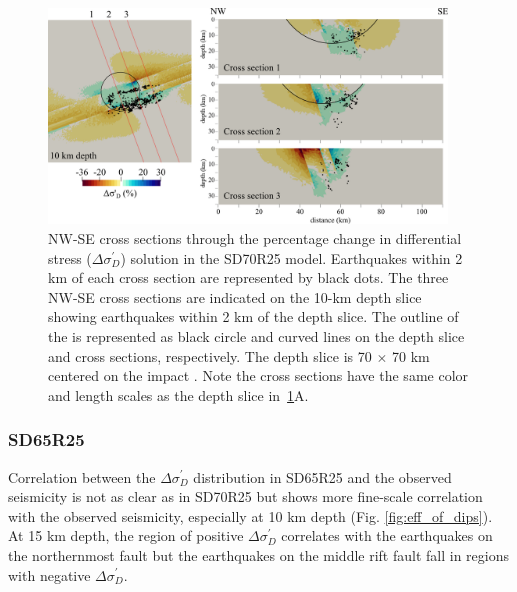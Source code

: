 \documentclass[draft]{agujournal2018}
\begin{document}
\begin{figure}[ht]
\centering
\includegraphics[width=25pc]{Figures/SD70R25_profiles.png}
\caption{NW-SE cross sections through the percentage change in differential stress ($\Delta\sigma_{D}^{\prime}$) solution in the SD70R25 model. Earthquakes within 2 km of each cross section are represented by black dots. The three NW-SE cross sections are indicated on the 10-km depth slice showing earthquakes within 2 km of the depth slice. The outline of the  is represented as black circle and curved lines on the depth slice and cross sections, respectively. The depth slice is 70 $\times$ 70 km centered on the impact . Note the cross sections have the same color and length scales as the depth slice in~\ref{fig:profiles_70_70_70_2km}A.}
\label{fig:profiles_70_70_70_2km}
\end{figure}


\subsubsection{SD65R25}
Correlation between the $\Delta\sigma_{D}^{\prime}$ distribution in SD65R25 and the observed seismicity is not as clear as in SD70R25 but shows more fine-scale correlation with the observed seismicity, especially at 10 km depth (Fig. \ref{fig:eff_of_dips}). At 15 km depth, the region of positive $\Delta\sigma_{D}^{\prime}$ correlates with the earthquakes on the northernmost fault but the earthquakes on the middle rift fault fall in regions with negative $\Delta\sigma_{D}^{\prime}$. 
\end{document}
